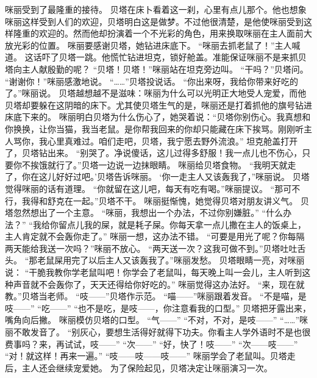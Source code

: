 \documentclass[a4paper,12pt,UTF8,twoside]{ctexbook}
\begin{document}
        咪丽受到了最隆重的接待。 
        贝塔在床卜看着这一刹，心里有点儿那个。他也想象咪丽这样受到人们的欢迎，贝塔明白这是做梦。不过他很清楚，是他使咪丽受到这样隆重的欢迎的。然而他却扮演着一个不光彩的角色，用来换取咪丽在主人面前大放光彩的位置。 
        咪丽要感谢贝塔，她钻进床底下。 
        “咪丽去抓老鼠了！”主人喊道。 
        这话吓了贝塔一跳。他慌忙钻进坦克，锁好舱盖。准能保证咪丽不是来抓贝塔向主人献殷勤的呢？ 
        “贝塔！贝塔！”咪丽站在坦克旁边叫。 
        “干吗？”贝塔问。 
        “谢谢你！”咪丽感激地说。 
        “……”贝塔投说话。 
        “你出来呀，我给你带来好吃的了。”咪丽说。 
        贝塔越想越不是滋味：咪丽为什么可以光明正大地受人宠爱，而他贝塔却要躲在这阴暗的床下。尤其使贝塔生气的是，咪丽还是打着抓他的旗号钻进床底下来的。 
        咪丽明白贝塔为什么伤心了，她哭着说：“贝塔你别伤心。我真想和你换换，让你当猫，我当老鼠。是你帮我回来的你却只能藏在床下挨骂。刚刚听主人骂你，我心里真难过。咱们走吧，贝塔，我宁愿去野外流浪。” 
        坦克舱盖打开了，贝塔钻出来。 
        “别哭了。净说傻话，这儿过得多舒服！我一点儿也不伤心，只要你不挨饿就行了。”贝塔一边说一边抹眼睛。 
        咪丽给贝塔食物。 
        “我明天就走了，你在这儿好好过吧。’贝塔告诉咪丽。 
        ‘你一走主人又该轰我了，”咪丽说。 
        贝塔觉得咪丽的话有道理。 
        “你就留在这儿吧，每天有吃有喝。”咪丽提议。 
        “那可不行，我得和舒克在一起。”贝塔不干。 
        咪丽挺惭愧，她觉得贝塔对朋友讲义气。 
        贝塔忽然想出了一个主意。 
        “咪丽，我想出一个办法，不过你别嫌脏。” 
        “什么办法？” 
        “我给你留点儿我的屎，就是耗子屎。你每天拿一点儿撒在主人的饭桌上，主人肯定就不会轰你走了。” 
        咪丽一想，这办法不错。 
        “可要是用光了呢？你每隔两天能给我送一次吗？”咪丽不放心。 
        “两天送一次？这我可做不到。”贝塔吐吐舌头。 
        “那老鼠屎用完了以后主人又该轰我了。”咪丽发愁。 
        贝塔眼睛一亮，对咪丽说：  “干脆我教你学老鼠叫吧！你学会了老鼠叫，每天晚上叫一会儿，主人听到这种声音就不会轰你了，天天还得给你好吃的。” 
        咪丽觉得这办法好。 
        “来，现在就教。”贝塔当老师。 
        “吱——”贝塔作示范。 
        “喵——”咪丽跟着发音。 
        “不是喵，是吱——” 
        “吃——” 
        “也不是吃，是吱——，你注意看我的口型。” 
        贝塔把牙露出来，嘴角向后撇。 
        咪丽模仿贝塔的口型。 
        “气——” 
        “不对，不对，是吱——” 
        “……”咪丽不敢发音了。 
        “别灰心，要想生活得好就得下功夫。你看主人学外语时不是也很费事吗？来，再试试，吱——” 
        “次——” 
        “好，快了！吱——” 
        “次——吱——” 
        “对！就这样！再来一遍。” 
        “吱——吱——吱——” 
        咪丽学会了老鼠叫。贝塔走后，主人还会继续宠爱她。 
        为了保险起见，贝塔决定让咪丽演习一次。 
\end{document}
